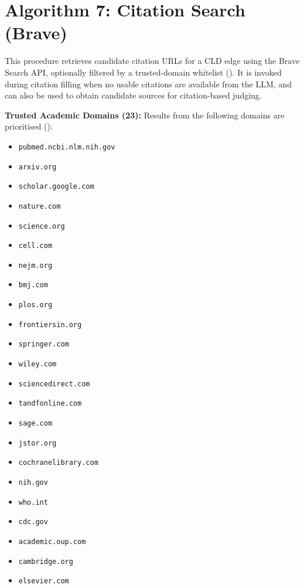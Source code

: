 \section{Algorithm 7: Citation Search (Brave)}
\label{alg:citation_search_brave}

This procedure retrieves candidate citation URLs for a CLD edge using the Brave Search API, optionally filtered by a trusted-domain whitelist (\cite{bravesearchapi}). It is invoked during citation filling when no usable citations are available from the LLM, and can also be used to obtain candidate sources for citation-based judging.

\vspace{0.25em}
\noindent\textbf{Trusted Academic Domains (23):} Results from the following domains are prioritised (\cite{bravesearchapi}):
\begin{itemize}[noitemsep]
    \item \texttt{pubmed.ncbi.nlm.nih.gov}
    \item \texttt{arxiv.org}
    \item \texttt{scholar.google.com}
    \item \texttt{nature.com}
    \item \texttt{science.org}
    \item \texttt{cell.com}
    \item \texttt{nejm.org}
    \item \texttt{bmj.com}
    \item \texttt{plos.org}
    \item \texttt{frontiersin.org}
    \item \texttt{springer.com}
    \item \texttt{wiley.com}
    \item \texttt{sciencedirect.com}
    \item \texttt{tandfonline.com}
    \item \texttt{sage.com}
    \item \texttt{jstor.org}
    \item \texttt{cochranelibrary.com}
    \item \texttt{nih.gov}
    \item \texttt{who.int}
    \item \texttt{cdc.gov}
    \item \texttt{academic.oup.com}
    \item \texttt{cambridge.org}
    \item \texttt{elsevier.com}
\end{itemize}

